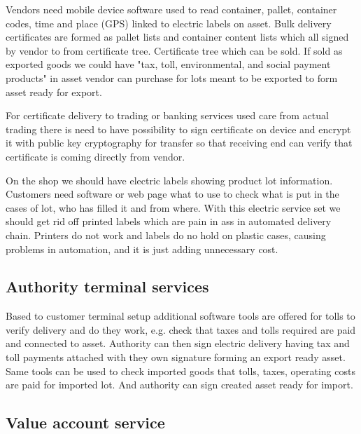 Vendors need mobile device software used to read container, pallet, container codes, time and place (GPS) linked to electric labels on asset. Bulk delivery certificates are formed as pallet lists and container content lists which all signed by vendor to from certificate tree. Certificate tree which can be sold. If sold as exported goods we could have "tax, toll, environmental, and social payment products" in asset vendor can purchase for lots meant to be exported to form asset ready for export.

For certificate delivery to trading or banking services used care from actual trading there is need to have possibility to sign certificate on device and encrypt it with public key cryptography for transfer so that receiving end can verify that certificate is coming directly from vendor.

On the shop we should have electric labels showing product lot information. Customers need software or web page what to use to check what is put in the cases of lot, who has filled it and from where. With this electric service set we should get rid off printed labels which are pain in ass in automated delivery chain. Printers do not work and labels do no hold on plastic cases, causing problems in automation, and it is just adding unnecessary cost.

\subsection{Authority terminal services}
\label{authority_terminal_service}

Based to customer terminal setup additional software tools are offered for tolls to verify delivery and do they work, e.g. check that taxes and tolls required are paid and connected to asset. Authority can then sign electric delivery having tax and toll payments attached with they own signature forming an export ready asset. Same tools can be used to check imported goods that tolls, taxes, operating costs are paid for imported lot. And authority can sign created asset ready for import.

\subsection{Value account service}
\label{value_account_service}

